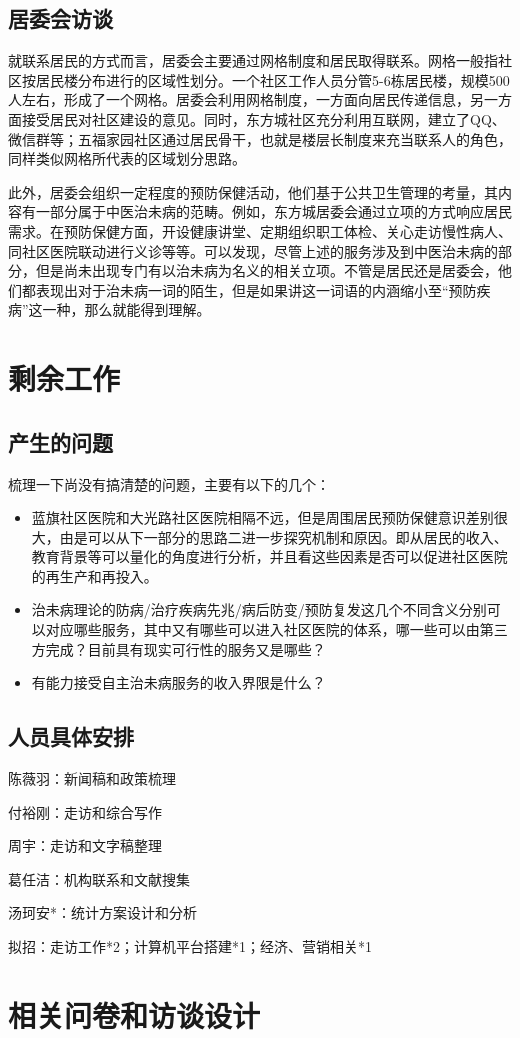 \documentclass{article}
\begin{document}
    \subsection{居委会访谈}
    就联系居民的方式而言，居委会主要通过网格制度和居民取得联系。网格一般指社区按居民楼分布进行的区域性划分。一个社区工作人员分管5-6栋居民楼，规模500人左右，形成了一个网格。居委会利用网格制度，一方面向居民传递信息，另一方面接受居民对社区建设的意见。同时，东方城社区充分利用互联网，建立了QQ、微信群等；五福家园社区通过居民骨干，也就是楼层长制度来充当联系人的角色，同样类似网格所代表的区域划分思路。
    
    此外，居委会组织一定程度的预防保健活动，他们基于公共卫生管理的考量，其内容有一部分属于中医治未病的范畴。例如，东方城居委会通过立项的方式响应居民需求。在预防保健方面，开设健康讲堂、定期组织职工体检、关心走访慢性病人、同社区医院联动进行义诊等等。可以发现，尽管上述的服务涉及到中医治未病的部分，但是尚未出现专门有以治未病为名义的相关立项。不管是居民还是居委会，他们都表现出对于治未病一词的陌生，但是如果讲这一词语的内涵缩小至“预防疾病”这一种，那么就能得到理解。
   \clearpage
    \section{剩余工作}
    \subsection{产生的问题}
    梳理一下尚没有搞清楚的问题，主要有以下的几个：
    \begin{itemize}
        \item 蓝旗社区医院和大光路社区医院相隔不远，但是周围居民预防保健意识差别很大，由是可以从下一部分的思路二进一步探究机制和原因。即从居民的收入、教育背景等可以量化的角度进行分析，并且看这些因素是否可以促进社区医院的再生产和再投入。
        \item 治未病理论的防病/治疗疾病先兆/病后防变/预防复发这几个不同含义分别可以对应哪些服务，其中又有哪些可以进入社区医院的体系，哪一些可以由第三方完成？目前具有现实可行性的服务又是哪些？
        \item 有能力接受自主治未病服务的收入界限是什么？
   \end{itemize}
\subsection{人员具体安排}
陈薇羽：新闻稿和政策梳理

付裕刚：走访和综合写作

周宇：走访和文字稿整理

葛任洁：机构联系和文献搜集

汤珂安*：统计方案设计和分析

拟招：走访工作*2；计算机平台搭建*1；经济、营销相关*1

    \section{相关问卷和访谈设计}

    
    
    \begin{spacing}{0.9}
            
        
\end{spacing}
\end{document}
